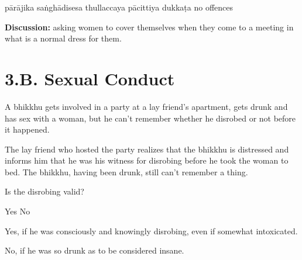 \begin{exam}{\autoExamName}
\begin{problem*}
\begin{parts}
  \begin{answers}{6}
    \bChoices
     pārājika\eAns
     saṅghādisesa\eAns
     thullaccaya\eAns
     pācittiya\eAns
     dukkaṭa\eAns
     no offences\eAns
    \eChoices
  \end{answers}

  \bigskip

  \textbf{Discussion:} asking women to cover themselves when they come to a
  meeting in what is a normal dress for them.

  \bigskip

\end{parts}

\end{problem*}

\end{exam}

\chapter{3.B. Sexual Conduct}
\renewcommand*{\theChapterTitle}{3.B. Sexual Conduct}

\begin{exam}{\autoExamName}

\begin{problem}
  A bhikkhu gets involved in a party at a lay friend's apartment, gets drunk and has sex with a woman,
  but he can't remember whether he disrobed or not before it happened.

  \bigskip

  The lay friend who hosted the party realizes that the bhikkhu is distressed
  and informs him that he was his witness for disrobing
  before he took the woman to bed.
  The bhikkhu, having been drunk, still can't remember a thing.

  \bigskip

  Is the disrobing valid?

  \bigskip

  \begin{answers}{2}
    \bChoices
     Yes\eAns
     No\eAns
    \eChoices
  \end{answers}

  \begin{solution}
    Yes, if he was consciously and knowingly disrobing, even if somewhat intoxicated.

    No, if he was so drunk as to be considered insane.
  \end{solution}

\end{problem}

\end{exam}
